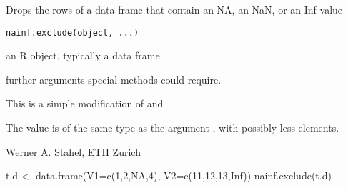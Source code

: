 \documentclass{article}
\begin{document}
\begin{Description}\relax
Drops the rows of a data frame that contain an NA, an NaN, or an Inf value
\end{Description}
\begin{Usage}
\begin{verbatim}
nainf.exclude(object, ...)
\end{verbatim}
\end{Usage}
\begin{Arguments}
\begin{ldescription}
\item[\code{object}] an R object, typically a data frame
\item[\code{...}] further arguments special methods could require.
\end{ldescription}
\end{Arguments}
\begin{Details}\relax
This is a simple modification of  and
\end{Details}
\begin{Value}
The value is of the same type as the argument ,
with possibly less elements.
\end{Value}
\begin{Author}\relax
Werner A. Stahel, ETH Zurich
\end{Author}
\begin{SeeAlso}\relax
{}
\end{SeeAlso}
\begin{Examples}
\begin{ExampleCode}
t.d <- data.frame(V1=c(1,2,NA,4), V2=c(11,12,13,Inf))
nainf.exclude(t.d)
\end{ExampleCode}
\end{Examples}
\end{document}
